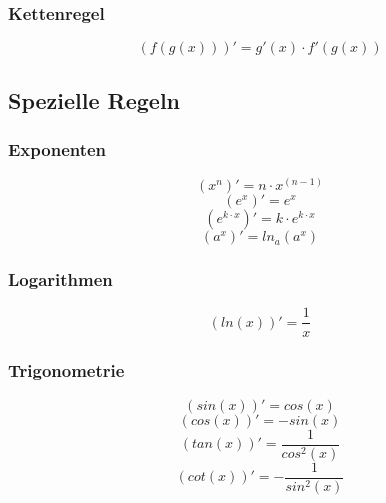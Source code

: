 \subsubsection{Kettenregel}
\[ \boxed{ (f(g(x)))' = g'(x) \cdot f'(g(x)) } \]

\newpage

\subsection{Spezielle Regeln}

\subsubsection{Exponenten}
\[ \boxed{ (x^n)' = n\cdot x^{(n-1)} } \]
\[ \boxed{ (e^x)' = e^x } \]
\[ \boxed{ (e^{k\cdot x})' = k \cdot e^{k\cdot x} } \]
\[ \boxed{ (a^x)' = ln_a (a^x) } \]

\subsubsection{Logarithmen}
\[ \boxed{ (ln(x))' = \frac{1}{x} } \]  

\subsubsection{Trigonometrie}
\[ \boxed{ (sin(x))' = cos(x) } \]  
\[ \boxed{ (cos(x))' = -sin(x) } \] 
\[ \boxed{ (tan(x))' = \frac{1}{cos^2(x)} } \]  
\[ \boxed{ (cot(x))' = -\frac{1}{sin^2(x)} } \]
